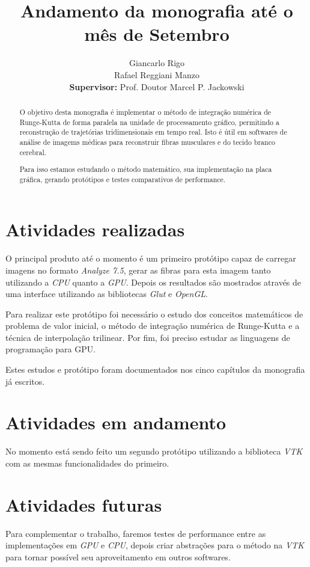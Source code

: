 \documentclass[a4paper,11pt]{report}
\title{Andamento da monografia até o mês de Setembro}
\author{Giancarlo Rigo\\
        Rafael Reggiani Manzo\\
        \textbf{Supervisor:} Prof. Doutor Marcel P. Jackowski}
\begin{document}
\maketitle
\tableofcontents

\begin{abstract}
O objetivo desta monografia é implementar o método de integração numérica de Runge-Kutta de forma paralela na unidade de processamento gráfico, permitindo a reconstrução de trajetórias tridimensionais em tempo real. Isto é útil em softwares de análise de imagems médicas para reconstruir fibras musculares e do tecido branco cerebral.

Para isso estamos estudando o método matemático, sua implementação na placa gráfica, gerando protótipos e testes comparativos de performance.
\end{abstract}

\chapter{Atividades realizadas}
O principal produto até o momento é um primeiro protótipo capaz de carregar imagens no formato \textit{Analyze 7.5}, gerar as fibras para esta imagem tanto utilizando a \textit{CPU} quanto a \textit{GPU}. Depois os resultados são mostrados através de uma interface utilizando as bibliotecas \textit{Glut} e \textit{OpenGL}.

Para realizar este protótipo foi necessário o estudo dos conceitos matemáticos de problema de valor inicial, o método de integração numérica de Runge-Kutta e a técnica de interpolação trilinear. Por fim, foi preciso estudar as linguagens de programação para GPU.

Estes estudos e protótipo foram documentados nos cinco capítulos da monografia já escritos.

\chapter{Atividades em andamento}
No momento está sendo feito um segundo protótipo utilizando a biblioteca \textit{VTK} com as mesmas funcionalidades do primeiro.

\chapter{Atividades futuras}
Para complementar o trabalho, faremos testes de performance entre as implementações em \textit{GPU} e \textit{CPU}, depois criar abstrações para o método na \textit{VTK} para tornar possível seu aproveitamento em outros softwares.
\end{document}
